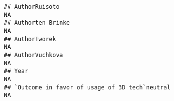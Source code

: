 \documentclass[]{article}
\begin{document}
\begin{verbatim}
## AuthorRuisoto                                                                                                                                                                                                                                                                                                                                                                                                                                                                        NA
## Authorten Brinke                                                                                                                                                                                                                                                                                                                                                                                                                                                                     NA
## AuthorTworek                                                                                                                                                                                                                                                                                                                                                                                                                                                                         NA
## AuthorVuchkova                                                                                                                                                                                                                                                                                                                                                                                                                                                                       NA
## Year                                                                                                                                                                                                                                                                                                                                                                                                                                                                                 NA
## `Outcome in favor of usage of 3D tech`neutral                                                                                                                                                                                                                                                                                                                                                                                                                                        NA

\end{verbatim}
\end{document}
